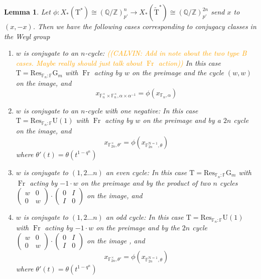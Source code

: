 \documentclass[12pt, reqno]{amsart}
\newtheorem{lemma}[theorem]{Lemma}
\theoremstyle{definition}
\theoremstyle{definition}
\theoremstyle{definition}
\newcommand{\aFieldNorm}{\mathrm{N}}
\newcommand{\finiteField}{\mathbb{F}}
\newcommand{\finiteFieldExtension}[1]{\finiteField_{#1}}
\newcommand{\NormOneGroup}[1]{\finiteFieldExtension{#1}^{\aFieldNorm = 1}}
\newcommand{\Frobenius}{\operatorname{Fr}}
\newcommand{\algebraicGroup}[1]{\boldsymbol{\mathrm{#1}}}
\newcommand{\calvin}[1]{\textcolor{orange}{\sffamily ((CALVIN: #1))}}
\begin{document}
\begin{lemma}
\label{lem:cochar_computation}
    Let $\phi:X_*(\algebraicGroup{T}^*) \cong (\mathbb{Q}/\mathbb{Z})_{p'}^n \to X_*(\tilde{\algebraicGroup{T}}^*) \cong (\mathbb{Q}/\mathbb{Z})_{p'}^{2n}$ send $x$ to $(x,-x)$. Then we have the following cases corresponding to conjugacy classes in the Weyl group
    \begin{enumerate}
        \item[B,C,D Case 1)] $w$ is conjugate to an $n$-cycle: \calvin{Add in note about the two type B cases. Maybe really should just talk about $\Frobenius$ action} In this case $\algebraicGroup{T} = \mathrm{Res}_{\mathbb{F}_n:\mathbb{F}}\algebraicGroup{G}_m$ with $\Frobenius$ acting by $w$ on the preimage and the cycle $(w,w)$ on the image, and $$x_{\finiteFieldExtension{n}^\times \times \finiteFieldExtension{n}^\times,\alpha \times \alpha^{-1}} = \phi(x_{\finiteFieldExtension{n},\alpha})$$
        \item[B,C,D Case 2)] $w$ is conjugate to an $n$-cycle with one negative:
 In this case $\algebraicGroup{T} = \mathrm{Res}_{\mathbb{F}_n:\mathbb{F}}\algebraicGroup{U}(1)$ with $\Frobenius$ acting by $w$ on the preimage and by a $2n$ cycle on the image, and $$x_{\finiteField_{2n}^\times,\theta'}=\phi(x_{\NormOneGroup{2n},\theta})$$ where $\theta'(t) = \theta(t^{1-q^n})$
    \item[$G=\algebraicGroup{U}$ Case 1)] $w$ is conjugate to $(1,2 \hdots n)$ an even cycle: In this case $\algebraicGroup{T} = \mathrm{Res}_{\mathbb{F}_n:\mathbb{F}}\algebraicGroup{G}_m$ with $\Frobenius$ acting by $-1\cdot w$ on the preimage and by the product of two $n$ cycles $\begin{pmatrix} w & 0 \\
        0 & w
        \end{pmatrix} \cdot \begin{pmatrix} 0 & I\\I & 0
        \end{pmatrix}$  on the image, and 
        \item[$G=\algebraicGroup{U}$ Case 2)] $w$ is conjugate to $(1,2 \hdots n)$ an odd cycle: In this case $\algebraicGroup{T} = \mathrm{Res}_{\mathbb{F}_n:\mathbb{F}}\algebraicGroup{U}(1)$ with $\Frobenius$ acting by $-1\cdot w$ on the preimage and by the $2n$ cycle $\begin{pmatrix} w & 0 \\
        0 & w
        \end{pmatrix} \cdot \begin{pmatrix} 0 & I\\I & 0
        \end{pmatrix}$ on the image , and $$x_{\finiteField_{2n}^\times,\theta'}=\phi(x_{\NormOneGroup{2n},\theta})$$ where $\theta'(t) = \theta(t^{1-q^n})$
    \end{enumerate}
\end{lemma}
\end{document}
